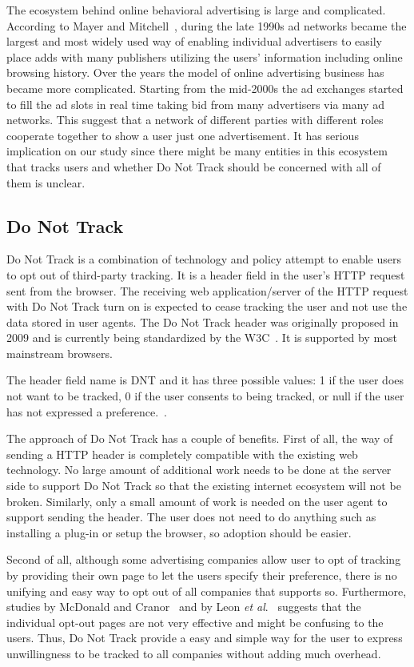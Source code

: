 \documentclass{sig-alternate}
\begin{document}
The ecosystem behind online behavioral advertising is large and complicated. According to Mayer and Mitchell~\cite{mayer2012third}, during the late 1990s ad networks became the largest and most widely used way of enabling individual advertisers to easily place adds with many publishers utilizing the users' information including online browsing history. Over the years the model of online advertising business has became more complicated. Starting from the mid-2000s the ad exchanges started to fill the ad slots in real time taking bid from many advertisers via many ad networks. This suggest that a network of different parties with different roles cooperate together to show a user just one advertisement. It has serious implication on our study since there might be many entities in this ecosystem that tracks users and whether Do Not Track should be concerned with all of them is unclear.

\subsection*{Do Not Track}

Do Not Track is a combination of technology and policy attempt to enable users to opt out of third-party tracking. It is a header field in the user’s HTTP request sent from the browser. The receiving web application/server of the HTTP request with Do Not Track turn on is expected to cease tracking the user and not use the data stored in user agents. The Do Not Track header was originally proposed in 2009 and is currently being standardized by the W3C~\cite{wikidnt}. It is supported by most mainstream browsers. 

The header field name is DNT and it has three possible values: 1 if the user does not want to be tracked, 0 if the user consents to being tracked, or null if the user has not expressed a preference.~\cite{wikidnt}. 

The approach of Do Not Track has a couple of benefits. First of all, the way of sending a HTTP header is completely compatible with the existing web technology. No large amount of additional work needs to be done at the server side to support Do Not Track so that the existing internet ecosystem will not be broken. Similarly, only a small amount of work is needed on the user agent to support sending the header. The user does not need to do anything such as installing a plug-in or setup the browser, so adoption should be easier.

Second of all, although some advertising companies allow user to opt of tracking by providing their own page to let the users specify their preference, there is no unifying and easy way to opt out of all companies that supports so. Furthermore, studies by McDonald and Cranor~\cite{mcdonald2010beliefs} and by Leon \emph{et al}.~\cite{leon2012johnny} suggests that the individual opt-out pages are not very effective and might be confusing to the users. Thus, Do Not Track provide a easy and simple way for the user to express unwillingness to be tracked to all companies without adding much overhead.
\end{document}
